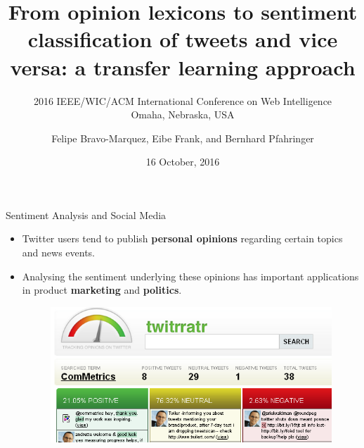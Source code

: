 \documentclass[handout]{beamer}
\title[WI'2016]{From opinion lexicons to sentiment classification of tweets and vice versa: a transfer learning approach}
\subtitle[WI'16]{2016 IEEE/WIC/ACM International Conference on Web Intelligence\\ Omaha, Nebraska, USA}
\author[Felipe Bravo Márquez]{\footnotesize
Felipe Bravo-Marquez, Eibe Frank, and Bernhard Pfahringer}
\institute{Department of Computer Science, University of Waikato }
\date{16 October, 2016}
\begin{document}
\begin{frame}
\titlepage


\end{frame}


\begin{frame}{Sentiment Analysis and Social Media}
\begin{scriptsize}
\begin{itemize}
 \item  Twitter users tend to publish \textbf{personal opinions} regarding certain topics and news events. 
 

 
 \item Analysing the sentiment underlying these opinions has important applications in product \textbf{marketing} and \textbf{politics}.
 
   \begin{figure}[h]
        	\includegraphics[scale = 0.4]{pics/tweetOpinions.png}
        \end{figure}
\end{itemize}
\end{scriptsize}

\end{frame}
\end{document}
